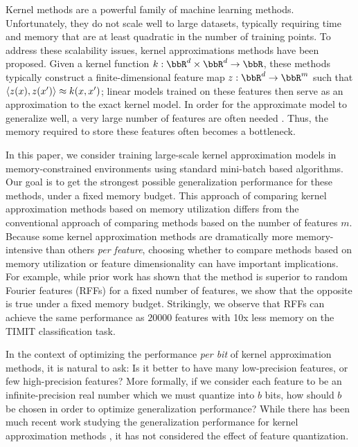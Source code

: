 
Kernel methods are a powerful family of machine learning methods.  Unfortunately, they do not scale well to large datasets, typically requiring time and memory that are at least quadratic in the number of training points. To address these scalability issues, kernel approximations methods have been proposed. Given a kernel function $k:\RR^d\times\RR^d\rightarrow \RR$, these methods typically construct a finite-dimensional feature map $z: \RR^d \rightarrow \RR^m$ such that $\langle z(x),z(x') \rangle \approx k(x,x')$; linear models trained on these features then serve as an approximation to the exact kernel model. In order for the approximate model to generalize well, a very large number of features are often needed \citep{rahimi08kitchen,block16,may2017}. Thus, the memory required to store these features often becomes a bottleneck.

In this paper, we consider training large-scale kernel approximation models in memory-constrained environments using standard mini-batch based algorithms. Our goal is to get the strongest possible generalization performance for these methods, under a fixed memory budget. This approach of comparing kernel approximation methods based on memory utilization differs from the conventional approach of comparing methods based on the number of features $m$. Because some kernel approximation methods are dramatically more memory-intensive than others \textit{per feature}, choosing whether to compare methods based on memory utilization or feature dimensionality can have important implications. For example, while prior work \citep{nysvsrff12} has shown that the \Nystrom method \citep{nystrom} is superior to random Fourier features (RFFs) \citep{rahimi07random} for a fixed number of features, we show that the opposite is true under a fixed memory budget. Strikingly, we observe that RFFs can achieve the same performance as $\num[group-separator={,}]{20000}$ \Nystrom features with 10x less memory on the TIMIT classification task.

In the context of optimizing the performance \textit{per bit} of kernel approximation methods, it is natural to ask: Is it better to have many low-precision features, or few high-precision features? More formally, if we consider each feature to be an infinite-precision real number which we must quantize into $b$ bits, how should $b$ be chosen in order to optimize generalization performance? While there has been much recent work studying the generalization performance for kernel approximation methods \citep{rudi17,avron17,musco17,bach17}, it has not considered the effect of feature quantization.

